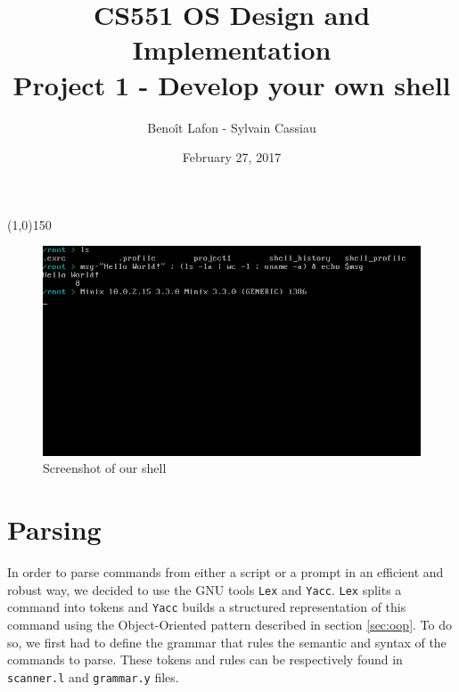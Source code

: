 \documentclass[fleqn]{article}
\title{CS551 OS Design and Implementation\\Project 1 - Develop your own shell}
\author{Benoît Lafon - Sylvain Cassiau}
\date{February 27, 2017}
\begin{document}
\maketitle

\begin{center}
\line(1,0){150}
\vspace{1cm}
\end{center}


\begin{figure}
    \centering
    \includegraphics[width=\textwidth]{screenshot}
    \caption{Screenshot of our shell}
    \label{fig:screenshot}
\end{figure}


\section{Parsing}

In order to parse commands from either a script or a prompt in an efficient and robust way, we decided to use the GNU tools \texttt{Lex} and \texttt{Yacc}.
\texttt{Lex} splits a command into tokens and \texttt{Yacc} builds a structured representation of this command using the Object-Oriented pattern described in section \ref{sec:oop}.
To do so, we first had to define the grammar that rules the semantic and syntax of the commands to parse. These tokens and rules can be respectively found in \texttt{scanner.l} and \texttt{grammar.y} files.
\end{document}
